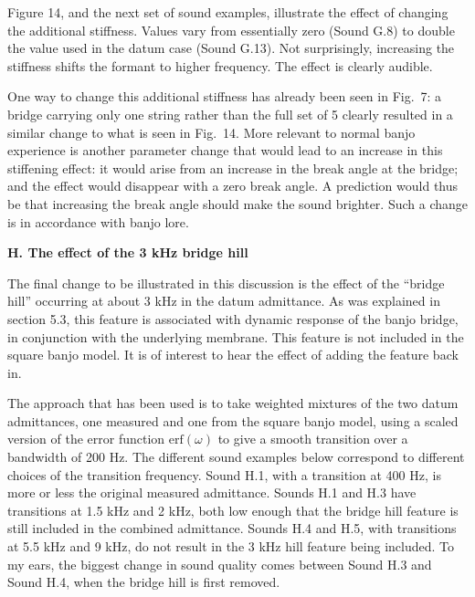   Figure 14, and the next set of sound examples, illustrate the effect of 
  changing the additional stiffness. Values vary from essentially zero (Sound 
  G.8) to double the value used in the datum case (Sound G.13). Not 
  surprisingly, increasing the stiffness shifts the formant to higher 
  frequency. The effect is clearly audible. 

\audio{}

\audio{}

\audio{}

\audio{}

\audio{}

\audio{}


  One way to change this additional stiffness has already been seen in Fig.\ 7: 
  a bridge carrying only one string rather than the full set of 5 clearly 
  resulted in a similar change to what is seen in Fig.\ 14. More relevant to 
  normal banjo experience is another parameter change that would lead to an 
  increase in this stiffening effect: it would arise from an increase in the 
  break angle at the bridge; and the effect would disappear with a zero break 
  angle. A prediction would thus be that increasing the break angle should make 
  the sound brighter. Such a change is in accordance with banjo lore. 

  \textbf{H. The effect of the 3 kHz bridge hill} 

  The final change to be illustrated in this discussion is the effect of the 
  ``bridge hill'' occurring at about 3 kHz in the datum admittance. As was 
  explained in section 5.3, this feature is associated with dynamic response of 
  the banjo bridge, in conjunction with the underlying membrane. This feature 
  is not included in the square banjo model. It is of interest to hear the 
  effect of adding the feature back in. 

  The approach that has been used is to take weighted mixtures of the two datum 
  admittances, one measured and one from the square banjo model, using a scaled 
  version of the error function $\mathrm{erf}(\omega)$ to give a smooth 
  transition over a bandwidth of 200 Hz. The different sound examples below 
  correspond to different choices of the transition frequency. Sound H.1, with 
  a transition at 400 Hz, is more or less the original measured admittance. 
  Sounds H.1 and H.3 have transitions at 1.5 kHz and 2 kHz, both low enough 
  that the bridge hill feature is still included in the combined admittance. 
  Sounds H.4 and H.5, with transitions at 5.5 kHz and 9 kHz, do not result in 
  the 3 kHz hill feature being included. To my ears, the biggest change in 
  sound quality comes between Sound H.3 and Sound H.4, when the bridge hill is 
  first removed. 

